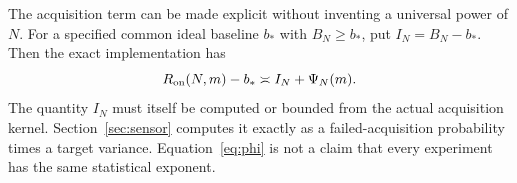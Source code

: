 The acquisition term can be made explicit without inventing a universal power of $N$. For a specified common ideal baseline $b_*$ with $B_N\ge b_*$, put $I_N=B_N-b_*$. Then the exact implementation has
\begin{equation}\label{eq:phi}
 R_{\mathrm{on}}(N,m)-b_*\asymp I_N+\Psi_N(m).
\end{equation}
The quantity $I_N$ must itself be computed or bounded from the actual acquisition kernel. Section~\ref{sec:sensor} computes it exactly as a failed-acquisition probability times a target variance. Equation~\eqref{eq:phi} is not a claim that every experiment has the same statistical exponent.

